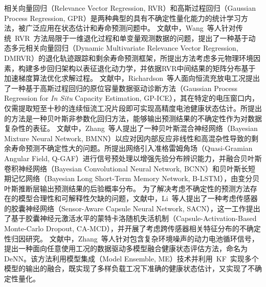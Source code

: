 % 
相关向量回归（Relevance Vector Regression, RVR）和高斯过程回归（Gaussian Process Regression, GPR）是两种典型的具有不确定性量化能力的统计学习方法，被广泛应用在状态估计和寿命预测问题中。
文献\cite{rvr_rul_9552552}中，Wang~等人针对传统~RVR~方法局限于一维退化过程和单变量观测数据的问题，提出了一种基于动态多元相关向量回归（Dynamic Multivariate Relevance Vector Regression, DMRVR）的退化轨迹跟踪和剩余寿命预测框架，所提出方法考虑多元物理环境因素，构建多步回归架构以表征退化动力学，并依据RVR中间结果的矩阵分布基于加速梯度算法优化求解过程。
% 
文献\cite{gpr_soh_8263147}中，Richardson~等人面向恒流充放电工况提出了一种基于高斯过程回归的原位容量数据驱动诊断方法（Gaussian Process Regression for \textit{In Situ} Capacity Estimation, GP-ICE），其在特定的电压窗口内，仅需提取短至十秒的连续恒流工况片段即可实现高精度电池健康状态估计。所提出的方法是一种贝叶斯非参数化回归方法，能够输出预测结果的不确定性作为对数据复杂性的表征。
% 
文献\cite{bbb_rul_9738999}中，Zhang~等人提出了一种贝叶斯混合神经网络（Bayesian Mixture Neural Network, BMNN）以应对因内部反应非线性和高混杂性导致的剩余寿命预测不确定性大的问题。所提出网络引入准格雷姆角场（Quasi-Gramian Angular Field, Q-GAF）进行信号预处理以增强先验分布辨识能力，并融合贝叶斯卷积神经网络（Bayesian Convolutional Neural Network, BCNN）和贝叶斯长短期记忆网络（Bayesian Long Short-Term Memory Network, B-LSTM），由变分贝叶斯推断层输出预测结果的后验概率分布。
%
为了解决考虑不确定性的预测方法存在的模型合理性和可解释性欠缺的问题，文献\cite{capsnet_rul_li2024sensor}中，Li~等人提出了一种考虑传感器的胶囊神经网络（Sensor-Aware Capsule Neural Network, SACN），这一工作提出了基于胶囊神经元激活水平的蒙特卡洛随机失活机制（Capsule-Activation-Based Monte-Carlo Dropout, CA-MCD），并开展了考虑跨传感器相关特征分布的不确定性归因研究。
%
文献\cite{ensemble2_soh_10102497}中，Zhang~等人针对包含复杂环境噪声的动力电池循环信号，提出一种面向任意使用工况的数据驱动多模型融合健康状态评估方法，命名为DeNN。该方法利用模型集成（Model Ensemble, ME）技术并利用~KF~实现多个模型的输出的融合，既实现了多样负载工况下准确的健康状态估计，又实现了不确定性量化。
